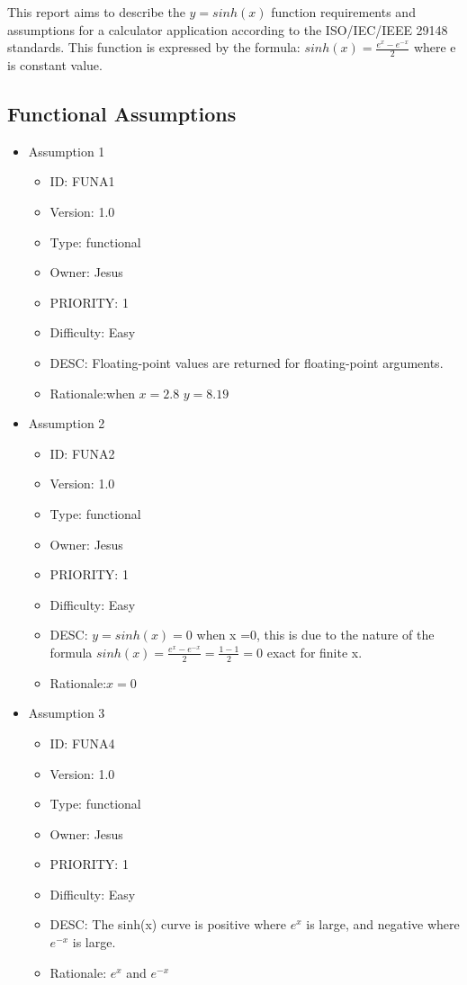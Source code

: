 \documentclass[12pt]{report}
\begin{document}
This report aims to describe the $y=sinh(x)$ function requirements and assumptions for a calculator application according to the ISO/IEC/IEEE 29148 standards.
This function is expressed by the formula:
$sinh(x)= \frac{e^x- e^{-x}}{2}$ where e is constant value.

\subsection{Functional Assumptions}

\begin{itemize}
\item Assumption 1
\begin{itemize}
\item ID:       FUNA1
\item Version:  1.0
\item Type:     functional
\item Owner:    Jesus
\item PRIORITY: 1 
\item Difficulty: Easy
\item DESC: Floating-point values are returned for floating-point arguments.
\item Rationale:when $x=2.8$  $y = 8.19$

\end{itemize}
\item Assumption 2
\begin{itemize}
\item ID:       FUNA2
\item Version:  1.0
\item Type:     functional
\item Owner:    Jesus
\item PRIORITY: 1 
\item Difficulty: Easy
\item DESC: $y=sinh(x) =0$ when x =0, this is due to the nature of the formula $sinh(x)= \frac{e^x- e^{-x}}{2} = \frac{1 - 1}{2}=0$ exact for finite x.
\item Rationale:$x=0$
\end{itemize}
\pagebreak

\item Assumption 3
\begin{itemize}
\item ID:       FUNA4
\item Version:  1.0
\item Type:     functional
\item Owner:    Jesus
\item PRIORITY: 1 
\item Difficulty: Easy
\item DESC: The sinh(x) curve is positive where $e^{x}$ is large, and negative where $e^{-x}$ is large.
\item Rationale: $e^{x}$ and $e^{-x}$
\end{itemize}
\end{itemize}
\end{document}
